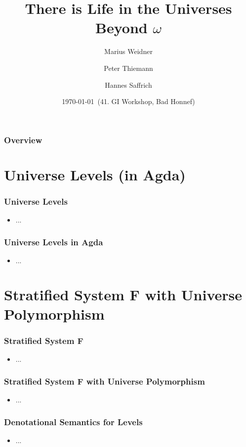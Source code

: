 \documentclass[dvipsnames,aspectratio=169,pdftex]{beamer}
\title{There is Life in the Universes Beyond $\omega$}
\author[Weidner, Thiemann, Saffrich]{Marius Weidner \and Peter Thiemann \and Hannes Saffrich}
\institute{University of Freiburg}
\date{\today \ (41. GI Workshop, Bad Honnef)}
\begin{document}
\begin{frame}{\null}
  \titlepage 
\end{frame}

\begin{frame}[fragile]
  \frametitle{Overview}
  \tableofcontents
\end{frame}

\section{Universe Levels (in Agda)}

\begin{frame}[fragile]
  \frametitle{Universe Levels}
  \begin{itemize}
    \item ...
  \end{itemize}
\end{frame}

\begin{frame}[fragile]
  \frametitle{Universe Levels in Agda}
  \begin{itemize}
    \item ...
  \end{itemize}
\end{frame}

\section{Stratified System F with Universe Polymorphism}

\begin{frame}[fragile]
  \frametitle{Stratified System F}
  \begin{itemize}
    \item ...
  \end{itemize}
\end{frame}

\begin{frame}[fragile]
  \frametitle{Stratified System F with Universe Polymorphism}
  \begin{itemize}
    \item ...
  \end{itemize}
\end{frame}


\begin{frame}[fragile]
  \frametitle{Denotational Semantics for Levels}
  \begin{itemize}
    \item ...
  \end{itemize}
\end{frame}
\end{document}
